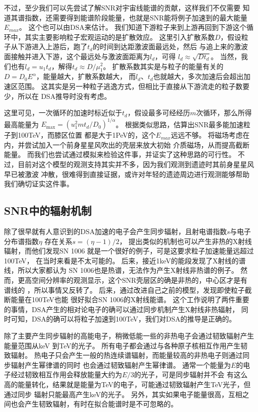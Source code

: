 不过，至少我们可以先尝试了解SNR对宇宙线能谱的贡献\citep{Ptuskin2010}，这样我们不仅需要
知道其谱指数，还需要得到能谱阶段能量，也就是SNR能将例子加速到的最大能量$E_{max}$。
这个也可以由DSA来估计。
我们知道下游粒子来到上游再回到下游这个循环中，其实主要影响粒子宏观运动的是扩散效应。
这里引入扩散系数$D$，假设粒子从下游进入上游后，跑了$t_d$的时间到达距激波面最远处，然后
与追上来的激波面接触并进入下游，这个最远处与激波面距离为$l_d$，可得
$l_{d} \approx \sqrt{D t_{d}}$。
当然，我们也有$l_{d}=u_{1} t_{d}$，解得$t_d \approx D/\mu_1^2$。
扩散系数其实是与粒子的能量有关的$D=D_{0} E^{\alpha}$，能量越大，扩散系数越大，
而$l_{d}$、$t_{d}$也就越大，多次加速后会超出加速区范围。
这其实是另一种粒子逃逸方式\citep{Li2012}，但相比于直接从下游流走的粒子数要少，所以在
DSA推导时没有考虑。

这里可见，一次循环的加速时标近似于$t_{d}$，假设最多可经经历$m$次循环，那么所得最高能量为
$E_{\max }=(u_{1}^{2} m t_{d}/D_{0})^{1/\alpha}$。
根据类似思路，\citet{1983A&A...125..249L}估算出SNR最多能加速粒子到100TeV，而膝区位置
都是大于1PeV的，这个$E_{max}$远远不够。
\citet{Zirakashvili2018}将磁场考虑在内，并尝试加入一个前身星星风吹出的壳层来放大初始
介质磁场，从而提高截断能量。
而我们也尝试通过模拟来检验这件事，并证实了这种思路的可行性\citep{Zhang2018}。
不过，目前对这个模型的观测支持其实并不多，因为我们观测到遗迹时其前身星星风早已被激波
冲散，很难得到直接证据，或许对年轻的遗迹周边进行观测能够帮助我们确切证实这件事。

\subsection{SNR中的辐射机制}

除了很早就有人意识到的DSA加速的电子会产生同步辐射，且射电谱指数$s$与电子分布谱指数$\eta$
存在关系$s=(\eta-1)/2$，
\citet{Reynolds1981}提出类似的机制也可以产生非热的X射线辐射，而他们发现SN 1006
就是一个很好的例子\citep{Becker1980}，可是这要求粒子加速能量远超过100TeV，
在当时来看是不太可能的。
后来，\citet{1982ApL....22..103G}接近1keV的能段发现了X射线的谱线，所以大家都认为
SN 1006也是热谱，无法作为产生X射线非热谱的例子。
然而，更高空间分辨率的观测显示，这个SNR壳层区的确是非热的，中心区才是有谱线的
\citep{Koyama1995}，所以事情又反转了。
后来，\citep{Reynolds1998}通过改进自己之前的模型，发现即使粒子截断能量在100TeV也能
很好拟合SN 1006的X射线能谱。
这个工作说明了两件重要的事情，DSA产生的相对论电子的确可以通过同步机制产生X射线非热辐射，
同时可知，DSA的确可以将粒子加速到100TeV，我们对DSA的推导是正确的。

除了主要产生同步辐射的高能电子，稍微低能一些的非热电子会通过韧致辐射产生能量范围从keV
到TeV的光子。
所有电子都会通过与各种原子核相互作用产生韧致辐射。
热电子只会产生一般的热连续谱辐射，而能量较高的非热电子则通过同步辐射产生幂律谱的同时
也会通过韧致辐射产生幂律谱。
通常一个能量为$E$的电子经过韧致相互作用会释放能量大约为$E/3$的光子，可是同步辐射并不会
有这么高的能量转化，结果就是能量为TeV的电子，可能通过韧致辐射产生TeV光子，但通过同步
辐射只能最高产生keV的光子。
另外，其实如果电子能量很高，互相之间也会产生韧致辐射，有时在拟合能谱时是不可忽略的。

